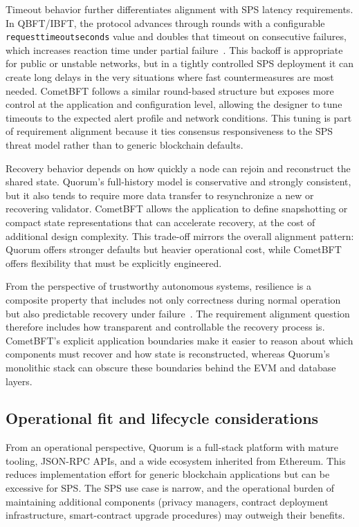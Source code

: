Timeout behavior further differentiates alignment with SPS latency requirements. In QBFT/IBFT, the protocol advances through rounds with a configurable \texttt{requesttimeoutseconds} value and doubles that timeout on consecutive failures, which increases reaction time under partial failure~\cite{QBFTCons90:online}. This backoff is appropriate for public or unstable networks, but in a tightly controlled SPS deployment it can create long delays in the very situations where fast countermeasures are most needed. CometBFT follows a similar round-based structure but exposes more control at the application and configuration level, allowing the designer to tune timeouts to the expected alert profile and network conditions. This tuning is part of requirement alignment because it ties consensus responsiveness to the SPS threat model rather than to generic blockchain defaults.

Recovery behavior depends on how quickly a node can rejoin and reconstruct the shared state. Quorum's full-history model is conservative and strongly consistent, but it also tends to require more data transfer to resynchronize a new or recovering validator. CometBFT allows the application to define snapshotting or compact state representations that can accelerate recovery, at the cost of additional design complexity. This trade-off mirrors the overall alignment pattern: Quorum offers stronger defaults but heavier operational cost, while CometBFT offers flexibility that must be explicitly engineered.

From the perspective of trustworthy autonomous systems, resilience is a composite property that includes not only correctness during normal operation but also predictable recovery under failure~\cite{flammini2022towards}. The requirement alignment question therefore includes how transparent and controllable the recovery process is. CometBFT's explicit application boundaries make it easier to reason about which components must recover and how state is reconstructed, whereas Quorum's monolithic stack can obscure these boundaries behind the EVM and database layers.

\subsection{Operational fit and lifecycle considerations}
From an operational perspective, Quorum is a full-stack platform with mature tooling, JSON-RPC APIs, and a wide ecosystem inherited from Ethereum. This reduces implementation effort for generic blockchain applications but can be excessive for SPS. The SPS use case is narrow, and the operational burden of maintaining additional components (privacy managers, contract deployment infrastructure, smart-contract upgrade procedures) may outweigh their benefits.

